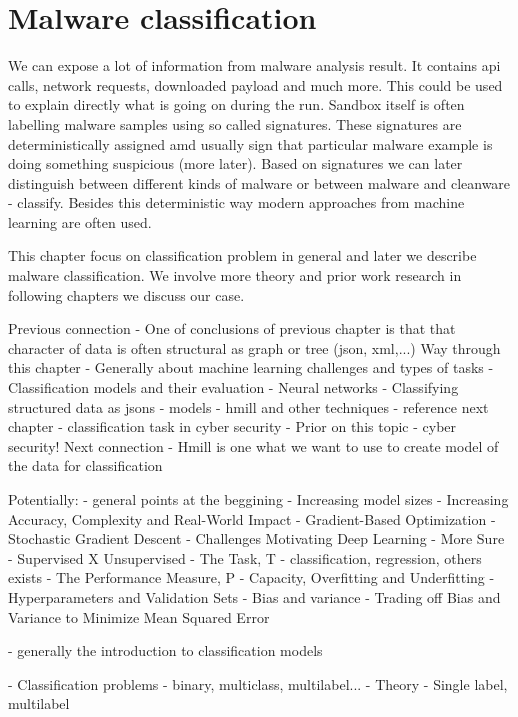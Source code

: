 \chapter{Malware classification}
We can expose a lot of information from malware analysis result. It contains api calls, network requests, downloaded payload and much more. This could be used to explain directly what is going on during the run. Sandbox itself is often labelling malware samples using so called signatures. These signatures are deterministically assigned amd usually sign that particular malware example is doing something suspicious (more later). Based on signatures we can later distinguish between different kinds of malware or between malware and cleanware - classify. Besides this deterministic way modern approaches from machine learning are often used.

This chapter focus on classification problem in general and later we describe malware classification. We involve more theory and prior work research in following chapters we discuss our case.


Previous connection
- One of conclusions of previous chapter is that that character of data is often structural as graph or tree (json, xml,...)
Way through this chapter
- Generally about machine learning challenges and types of tasks
- Classification models and their evaluation
- Neural networks
- Classifying structured data as jsons - models
- hmill and other techniques - reference next chapter
- classification task in cyber security
- Prior on this topic - cyber security!
Next connection
- Hmill is one what we want to use to create model of the data for classification


\cite{GoodBengCour16}
Potentially:
- general points at the beggining
    - Increasing model sizes
    - Increasing Accuracy, Complexity and Real-World Impact
    - Gradient-Based Optimization
    - Stochastic Gradient Descent
    - Challenges Motivating Deep Learning
- More Sure
    - Supervised X Unsupervised
    - The Task, T - classification, regression, others exists
    - The Performance Measure, P
    - Capacity, Overfitting and Underfitting
    - Hyperparameters and Validation Sets
    - Bias and variance - Trading off Bias and Variance to Minimize Mean Squared
    Error

\cite{Bishop2006}
 - generally the introduction to classification models


- Classification problems - binary, multiclass, multilabel...
- Theory
- Single label, multilabel

